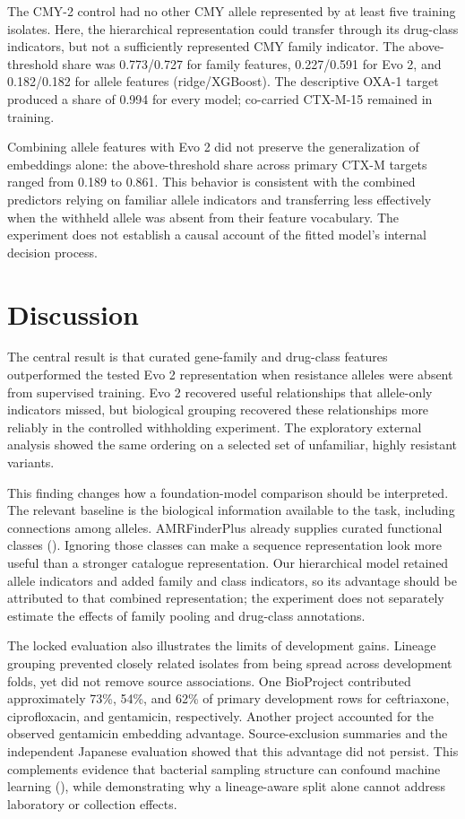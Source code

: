 \documentclass[
  american,
  11pt,
]{article}
\begin{document}
The CMY-2 control had no other CMY allele represented by at least five
training isolates. Here, the hierarchical representation could transfer
through its drug-class indicators, but not a sufficiently represented
CMY family indicator. The above-threshold share was 0.773/0.727 for
family features, 0.227/0.591 for Evo 2, and 0.182/0.182 for allele
features (ridge/XGBoost). The descriptive OXA-1 target produced a share
of 0.994 for every model; co-carried CTX-M-15 remained in training.

Combining allele features with Evo 2 did not preserve the generalization
of embeddings alone: the above-threshold share across primary CTX-M
targets ranged from 0.189 to 0.861. This behavior is consistent with the
combined predictors relying on familiar allele indicators and
transferring less effectively when the withheld allele was absent from
their feature vocabulary. The experiment does not establish a causal
account of the fitted model's internal decision process.

\section{Discussion}\label{discussion}

The central result is that curated gene-family and drug-class features
outperformed the tested Evo 2 representation when resistance alleles
were absent from supervised training. Evo 2 recovered useful
relationships that allele-only indicators missed, but biological
grouping recovered these relationships more reliably in the controlled
withholding experiment. The exploratory external analysis showed the
same ordering on a selected set of unfamiliar, highly resistant
variants.

This finding changes how a foundation-model comparison should be
interpreted. The relevant baseline is the biological information
available to the task, including connections among alleles.
AMRFinderPlus already supplies curated functional classes
(). Ignoring those
classes can make a sequence representation look more useful than a
stronger catalogue representation. Our hierarchical model retained
allele indicators and added family and class indicators, so its
advantage should be attributed to that combined representation; the
experiment does not separately estimate the effects of family pooling
and drug-class annotations.

The locked evaluation also illustrates the limits of development gains.
Lineage grouping prevented closely related isolates from being spread
across development folds, yet did not remove source associations. One
BioProject contributed approximately 73\%, 54\%, and 62\% of primary
development rows for ceftriaxone, ciprofloxacin, and gentamicin,
respectively. Another project accounted for the observed gentamicin
embedding advantage. Source-exclusion summaries and the independent
Japanese evaluation showed that this advantage did not persist. This
complements evidence that bacterial sampling structure can confound
machine learning (), while
demonstrating why a lineage-aware split alone cannot address laboratory
or collection effects.
\end{document}
